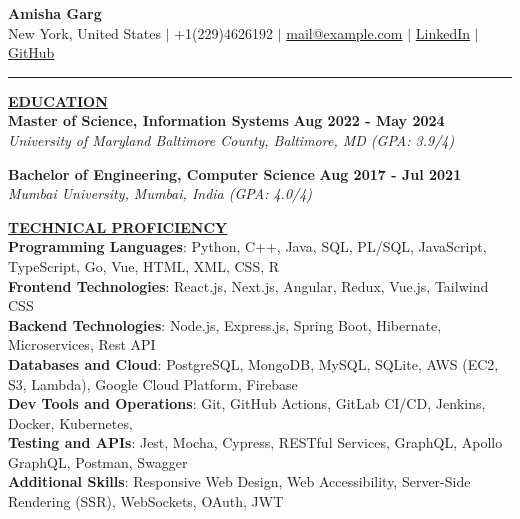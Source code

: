 \documentclass{article}
\begin{document}
\begin{center}
\thispagestyle{empty}
\large \textbf{Amisha Garg \\}
\normalsize New York, United States $\mid$ +1(229)4626192 $\mid$ \href{mailto:mail@example.com}{mail@example.com} $\mid$ \href{https://www.linkedin.com/in/your-linkedin}{LinkedIn} $\mid$ \href{https://github.com/your-github}{GitHub} \\
\rule{\textwidth}{1pt}
\end{center}

\noindent \textbf{\underline{EDUCATION}} \\
\textbf{Master of Science, Information Systems } \hfill \textbf{Aug 2022 - May 2024} \\
\textit{University of Maryland Baltimore County, Baltimore, MD (GPA: 3.9/4)}  
\begin{itemize}[noitemsep,nolistsep,leftmargin=*]
\end{itemize}


\textbf{Bachelor of Engineering, Computer Science} \hfill \textbf{Aug 2017 - Jul 2021} \\
\textit{Mumbai University, Mumbai, India (GPA: 4.0/4)}
\begin{itemize}[noitemsep,nolistsep,leftmargin=*]
\end{itemize}

\vspace{2mm}
\noindent \textbf{\underline{TECHNICAL PROFICIENCY}} \\
\textbf{Programming Languages}{: \small Python, C++, Java, SQL, PL/SQL, JavaScript, TypeScript, Go, Vue, HTML, XML, CSS, R} \\
\textbf{Frontend Technologies}{: \small React.js, Next.js, Angular, Redux, Vue.js, Tailwind CSS} \\
\textbf{Backend Technologies}{: \small Node.js, Express.js, Spring Boot, Hibernate, Microservices, Rest API} \\
\textbf{Databases and Cloud}{: \small PostgreSQL, MongoDB, MySQL, SQLite, AWS (EC2, S3, Lambda), Google Cloud Platform, Firebase} \\
\textbf{Dev Tools and Operations}{: \small Git, GitHub Actions, GitLab CI/CD, Jenkins, Docker, Kubernetes,} \\
\textbf{Testing and APIs}{: \small Jest, Mocha, Cypress, RESTful Services, GraphQL, Apollo GraphQL, Postman, Swagger} \\
\textbf{Additional Skills}{: \small Responsive Web Design, Web Accessibility, Server-Side Rendering (SSR), WebSockets, OAuth, JWT}
\vspace{2mm}
\end{document}
